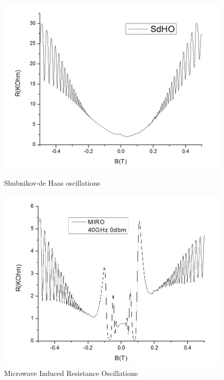 \documentclass[12pt]{ruthesis}
\begin{document}
\begin{figure}[!htb]\centering
   \begin{minipage}{0.49\textwidth}
     \includegraphics[width=\linewidth]{figures/sdho.JPG}
     \caption{Shubnikov-de Haas oscillations}\label{sdho}
   \end{minipage}
   \begin {minipage}{0.49\textwidth}
     \includegraphics[width=\linewidth]{figures/miro.JPG}
     \caption{Microwave Induced Resistance Oscillations}\label{miro}
   \end{minipage}
\end{figure}
\end{document}
